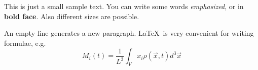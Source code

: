 \documentclass[12pt]{article}
\begin{document}
This is just a small sample text. You can write some words {\em
emphasized}\/, or in {\bf bold face}. Also different {\small sizes} 
are possible. 

An empty line generates a new paragraph. \LaTeX\  is very convenient 
for writing formulae, e.g.
\begin{equation}
M_i(t) = \frac{1}{L^3} \int_V x_i \rho(\vec{x},t) d^3\vec{x}
\end{equation}
\end{document}
